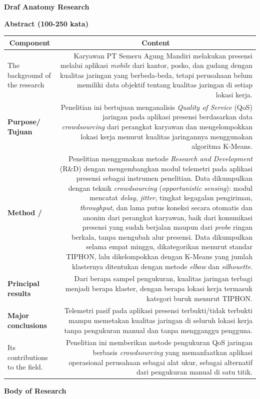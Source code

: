\documentclass[11pt,a4paper]{article}
\newcommand{\judul}[1]{\begin{center}\textbf{\large #1}\end{center}}
\newcommand{\kepala}{\multicolumn{1}{|c|}{\textbf{Component}} & \multicolumn{1}{c|}{\textbf{Content}}\\ \hline}
\begin{document}
\judul{\Large Draf Anatomy Research}
\judul{Abstract (100-250 kata)}

\begin{longtable}{|L|R|}
\hline
\kepala
\endhead
The background of the research &
Karyawan PT Semeru Agung Mandiri melakukan presensi melalui aplikasi \textit{mobile} dari kantor, posko, dan gudang dengan kualitas jaringan yang berbeda-beda, tetapi perusahaan belum memiliki data objektif tentang kualitas jaringan di setiap lokasi kerja. \\ \hline
\textbf{Purpose/ Tujuan} &
Penelitian ini bertujuan menganalisis \textit{Quality of Service} (QoS) jaringan pada aplikasi presensi berdasarkan data \textit{crowdsourcing} dari perangkat karyawan dan mengelompokkan lokasi kerja menurut kualitas jaringannya menggunakan algoritma K-Means. \\ \hline
\textbf{Method /} &
Penelitian menggunakan metode \textit{Research and Development} (R\&D) dengan mengembangkan modul telemetri pada aplikasi presensi sebagai instrumen penelitian. Data dikumpulkan dengan teknik \textit{crowdsourcing} (\textit{opportunistic sensing}): modul mencatat \textit{delay}, \textit{jitter}, tingkat kegagalan pengiriman, \textit{throughput}, dan lama putus koneksi secara otomatis dan anonim dari perangkat karyawan, baik dari komunikasi presensi yang sudah berjalan maupun dari \textit{probe} ringan berkala, tanpa mengubah alur presensi. Data dikumpulkan selama empat minggu, dikategorikan menurut standar TIPHON, lalu dikelompokkan dengan K-Means yang jumlah klasternya ditentukan dengan metode \textit{elbow} dan \textit{silhouette}. \\ \hline
\textbf{Principal results} &
Dari berapa sampel pengukuran, kualitas jaringan terbagi menjadi berapa klaster, dengan berapa lokasi kerja termasuk kategori buruk menurut TIPHON. \\ \hline
\textbf{Major conclusions} &
Telemetri pasif pada aplikasi presensi terbukti/tidak terbukti mampu memetakan kualitas jaringan di seluruh lokasi kerja tanpa pengukuran manual dan tanpa mengganggu pengguna. \\ \hline
Its contributions to the field. &
Penelitian ini memberikan metode pengukuran QoS jaringan berbasis \textit{crowdsourcing} yang memanfaatkan aplikasi operasional perusahaan sebagai alat ukur, sebagai alternatif dari pengukuran manual di satu titik. \\ \hline
\end{longtable}

\judul{Body of Research}
\end{document}
